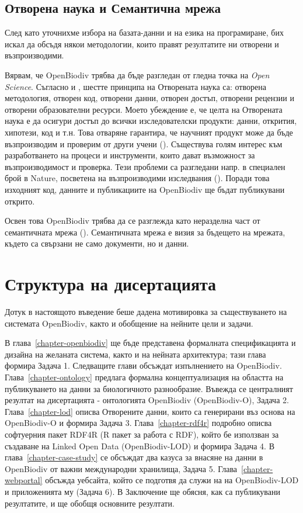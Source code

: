 \subsection*{Отворена наука и Семантична мрежа}

След като уточнихме избора на базата-данни и на езика на програмиране,  бих искал да обсъдя някои методологии, които правят резултатите ни отворени и възпроизводими.

Вярвам, че OpenBiodiv трябва да бъде разгледан от гледна точка на \emph{Open Science}. Съгласно \cite {kraker_case_2011} и \cite{noauthor_was_nodate}, шестте принципа на Отворената наука са: отворена методология, отворен код, отворени данни, отворен достъп, отворени рецензии и отворени образователни ресурси. Моето убеждение е, че целта на Отворената наука е да осигури достъп до всички изследователски продукти: данни, открития, хипотези, код и т.н. Това отваряне гарантира, че научният продукт може да бъде възпроизводим и проверим от други учени (\cite{mietchen_transformative_2014}). Съществува голям интерес към разработването на процеси и инструменти, които дават възможност за възпроизводимост и проверка. Тези проблеми са разгледани напр. в специален брой в Nature, посветена на възпроизводими изследвания (\cite {noauthor_challenges_2010}). Поради това изходният код, данните и публикациите на OpenBiodiv ще бъдат публикувани открито.

Освен това OpenBiodiv трябва да се разглежда като неразделна част от семантичната мрежа (\cite{berners-lee_semantic_2001}). Семантичната мрежа е визия за бъдещето на мрежата, където са свързани не само документи, но и данни.

\section*{Структура на дисертацията}

Дотук в настоящото въведение беше дадена мотивировка за съществуването на системата OpenBiodiv, както и обобщение на нейните цели и задачи.

В глава~\ref{chapter-openbiodiv} ще бъде представена формалната спецификацията и дизайна на желаната система, както и на нейната архитектура; тази глава формира Задача 1. Следващите глави обсъждат изпълнението на OpenBiodiv. Глава~\ref{chapter-ontology} предлага формална концептуализация на областта на публикуването на данни за биологичното разнообразие. Въвежда се централният резултат на дисертацията - онтологията OpenBiodiv (OpenBiodiv-O), Задача 2. Глава~\ref{chapter-lod} описва Отворените данни, които са генерирани въз основа на OpenBiodiv-O и формира Задача 3. Глава~\ref{chapter-rdf4r} подробно описва софтуерния пакет RDF4R (R пакет за работа с RDF), който бе използван за създаване на Linked Open Data (OpenBiodiv-LOD) и формира Задача 4. В глава~\ref{chapter-case-study} се обсъждат два казуса за внасяне на данни в OpenBiodiv от важни международни хранилища, Задача 5. Глава~\ref{chapter-webportal} обсъжда уебсайта, който се подготвя да служи на на OpenBiodiv-LOD и приложенията му (Задача 6).
В Заключение ще обясня, как са публикувани резултатите, и ще обобщя основните резултати.






